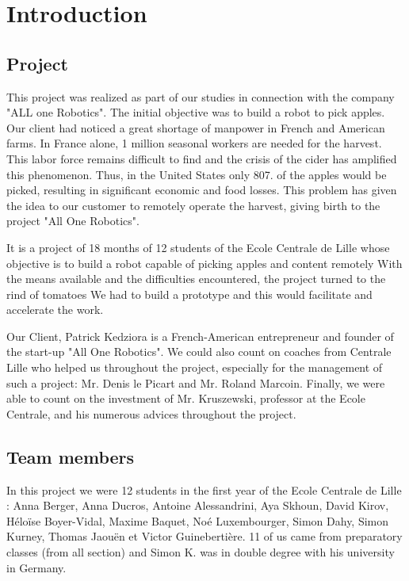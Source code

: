 \section*{Introduction}
\setcounter{figure}{0}

\subsection*{Project}

This project was realized as part of our studies in connection with the company "ALL one Robotics". The initial objective was to build a robot to pick apples. Our client had noticed a great shortage of manpower in French and American farms. In France alone, 1 million seasonal workers are needed for the harvest. This labor force remains difficult to find and the crisis of the cider has amplified this phenomenon. Thus, in the United States only 807. of the apples would be picked, resulting in significant economic and food losses. This problem has given the idea to our customer to remotely operate the harvest, giving birth to the project "All One Robotics". 

\bigbreak
It is a project of 18 months of 12 students of the Ecole Centrale de Lille whose objective is to build a robot capable of picking apples and content remotely With the means available and the difficulties encountered, the project turned to the rind of tomatoes We had to build a prototype and this would facilitate and accelerate the work.

\bigbreak
Our Client, Patrick Kedziora is a French-American entrepreneur and founder of the start-up "All One Robotics". We could also count on coaches from Centrale Lille who helped us throughout the project, especially for the management of such a project: Mr. Denis le Picart and Mr. Roland Marcoin. Finally, we were able to count on the investment of Mr. Kruszewski, professor at the Ecole Centrale, and his numerous advices throughout the project.

\subsection*{Team members}

In this project we were 12 students in the first year of the Ecole Centrale de Lille : Anna Berger, Anna Ducros, Antoine Alessandrini, Aya Skhoun, David Kirov, Héloïse Boyer-Vidal, Maxime Baquet, Noé Luxembourger, Simon Dahy, Simon Kurney, Thomas Jaouën et Victor Guinebertière. 11 of us came from preparatory classes (from all section) and Simon K. was in double degree with his university in Germany. 